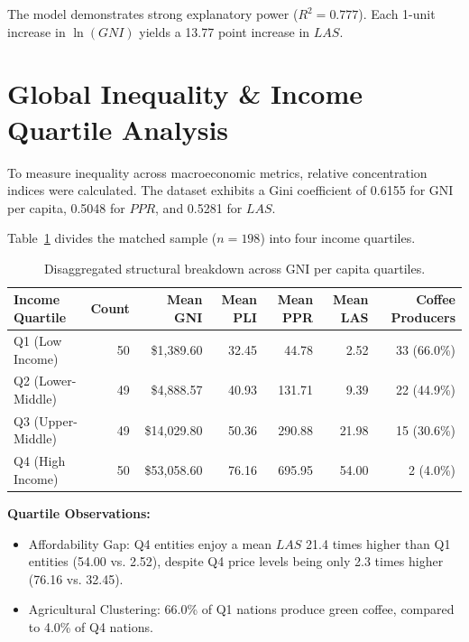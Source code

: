 \documentclass[11pt,a4paper]{article}
\begin{document}
The model demonstrates strong explanatory power ($R^2 = 0.777$). Each 1-unit increase in $\ln(GNI)$ yields a 13.77 point increase in $LAS$.

\section{Global Inequality \& Income Quartile Analysis}

To measure inequality across macroeconomic metrics, relative concentration indices were calculated. The dataset exhibits a Gini coefficient of 0.6155 for GNI per capita, 0.5048 for $PPR$, and 0.5281 for $LAS$.

Table~\ref{tab:quartile_summary} divides the matched sample ($n=198$) into four income quartiles.

\begin{table}[h]
\centering
\small
\begin{tabular}{@{}lrrrrrr@{}}
\toprule
\textbf{Income Quartile} & \textbf{Count} & \textbf{Mean GNI} & \textbf{Mean PLI} & \textbf{Mean PPR} & \textbf{Mean LAS} & \textbf{Coffee Producers} \\
\midrule
Q1 (Low Income) & 50 & \$1,389.60 & 32.45 & 44.78 & 2.52 & 33 (66.0\%) \\
Q2 (Lower-Middle) & 49 & \$4,888.57 & 40.93 & 131.71 & 9.39 & 22 (44.9\%) \\
Q3 (Upper-Middle) & 49 & \$14,029.80 & 50.36 & 290.88 & 21.98 & 15 (30.6\%) \\
Q4 (High Income) & 50 & \$53,058.60 & 76.16 & 695.95 & 54.00 & 2 (4.0\%) \\
\bottomrule
\end{tabular}
\caption{Disaggregated structural breakdown across GNI per capita quartiles.}
\label{tab:quartile_summary}
\end{table}

\textbf{Quartile Observations:}
\begin{itemize}[leftmargin=1.5em]
    \item Affordability Gap: Q4 entities enjoy a mean $LAS$ 21.4 times higher than Q1 entities (54.00 vs. 2.52), despite Q4 price levels being only 2.3 times higher (76.16 vs. 32.45).
    \item Agricultural Clustering: 66.0\% of Q1 nations produce green coffee, compared to 4.0\% of Q4 nations.
\end{itemize}
\end{document}
